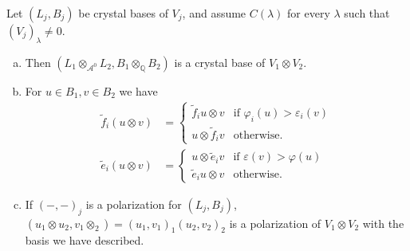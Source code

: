 \documentclass[11pt,fleqn]{article}
\newcommand\QQ{\mathbb Q}
\newcommand\ot{\otimes}
\newcommand\A{\mathcal A}
\begin{document}
\begin{Proposition}
\label{tensor-product}
Let $(L_j,B_j)$ be crystal bases of $V_j$, and assume $C(\lambda)$ for every $\lambda$
such that $(V_j)_\lambda \neq 0$.
	\begin{enumerate}[a)]
		\item Then $(L_1 \ot_{\A^0} L_2, B_1 \ot_\QQ B_2)$ is a crystal base of
			$V_1 \ot V_2$.
		\item For $u\in B_1, v \in B_2$ we have
			\begin{align*}
				\tilde f_i (u \ot v) &= 
					\begin{cases}
						\tilde f_i u \ot v &\mbox{if } \varphi_i(u)
									> \varepsilon_i(v)\\
						u \ot \tilde f_i v &\mbox{otherwise.}
					\end{cases} \\
				\tilde e_i (u \ot v) &=
					\begin{cases}
						u \ot \tilde e_i v &\mbox{if } \varepsilon(v)
									> \varphi(u) \\
						\tilde e_i u \ot v & \mbox{otherwise.}
					\end{cases}
			\end{align*}
		\item If $(-,-)_j$ is a polarization for $(L_j,B_j)$, $(u_1 \ot u_2, v_1
			\ot _2) = (u_1,v_1)_1(u_2,v_2)_2$ is a polarization of $V_1 \ot
			V_2$ with the basis we have described.
	\end{enumerate}	
\end{Proposition}
\end{document}
